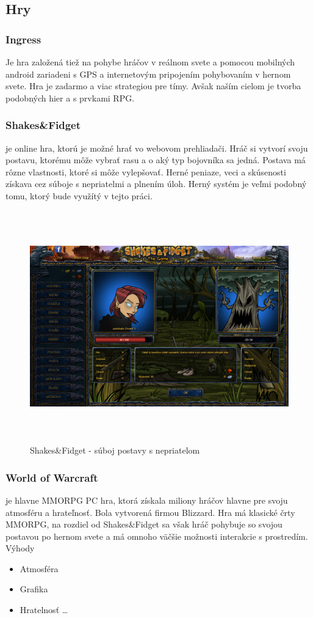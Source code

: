 \subsection{Hry}
\subsubsection{Ingress} Je hra založená tiež na pohybe hráčov v reálnom svete a pomocou mobilných android zariadeni s GPS a internetovým pripojením pohybovaním v hernom svete. Hra je zadarmo a viac strategiou pre tímy. Avšak naším cielom je tvorba podobných hier a s prvkami RPG.


\subsubsection{Shakes\&Fidget} je online hra, ktorú je možné hrať vo webovom prehliadači\cite{sfgame}. Hráč si vytvorí svoju postavu, ktorému môže vybrať rasu a o aký typ bojovníka sa jedná. Postava má rôzne vlastnosti, ktoré si môže vylepšovať. Herné peniaze, veci a skúsenosti získava cez súboje s nepriatelmi a plnením úloh. Herný systém je veľmi podobný tomu, ktorý bude využítý v tejto práci.

\begin{figure}
  \centering
  \includegraphics[height=10cm]{mainmatter/imgs/shakes.png}
  \caption{Shakes\&Fidget - súboj postavy s nepriatelom}
  \label{fig:comenius}
\end{figure}


\subsubsection{World of Warcraft} je hlavne MMORPG PC hra, ktorá získala miliony hráčov hlavne pre svoju atmosféru a hrateľnosť. Bola vytvorená firmou Blizzard\cite{wow-blizard}. Hra má klasické črty MMORPG, na rozdiel od Shakes\&Fidget sa však hráč pohybuje so svojou postavou po hernom svete a má omnoho väčšie možnosti interakcie s prostredím\cite{wow-blizard-guide}. 
Výhody
\begin{itemize}
  \item Atmosféra
  \item Grafika 
  \item Hratelnosť \ldots
\end{itemize}
